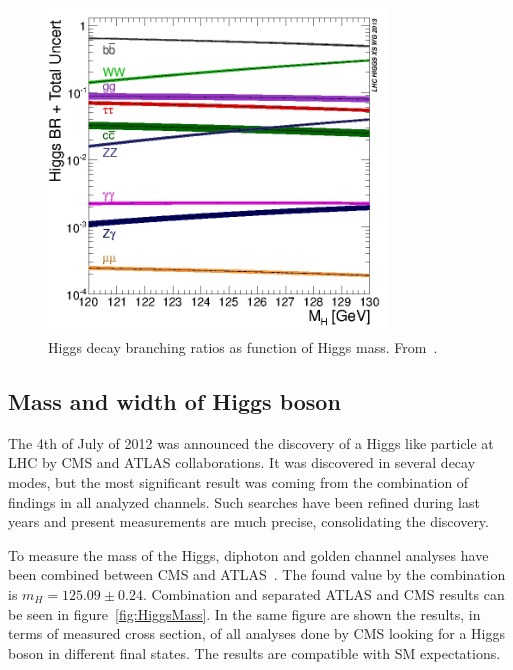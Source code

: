 \begin{figure}[!Hhtbp]
  \begin{center}
    \includegraphics[width=0.8\textwidth]{figs/Higgs_BR_120-130.jpg}
    \caption{Higgs decay branching ratios as function of Higgs mass. From~\cite{Dittmaier:2011ti, Dittmaier:2012vm, Heinemeyer:2013tqa, HIGGSXSWG}.}
    \label{fig:HiggsBrs}
  \end{center}
\end{figure}

\subsection{Mass and width of Higgs boson}

The 4th of July of 2012 was announced the discovery of a Higgs like particle at LHC by CMS and ATLAS collaborations. It was discovered in several decay modes, but the most significant result was coming from the combination of findings in all analyzed channels. Such searches have been refined during last years and present measurements are much precise, consolidating the discovery. 

To measure the mass of the Higgs, diphoton and golden channel analyses have been combined between CMS and ATLAS~\cite{Aad:2015zhl}. The found value by the combination is $m_{H}=125.09\pm 0.24$. Combination and separated ATLAS and CMS results can be seen in figure~\ref{fig:HiggsMass}. In the same figure are shown the results, in terms of measured cross section, of all analyses done by CMS looking for a Higgs boson in different final states. The results are compatible with SM expectations.

